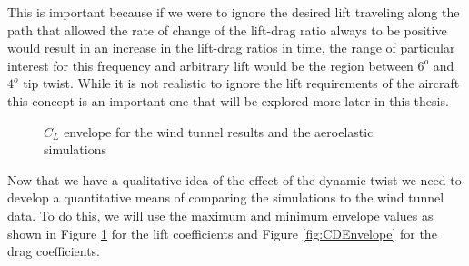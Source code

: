 \documentclass[11pt]{ucthesis}
\begin{document}
This is important because if we were to ignore the desired lift traveling along the path that allowed the rate of change of the lift-drag ratio always to be positive would result in an increase in the lift-drag ratios in time, the range of particular interest for this frequency and arbitrary lift would be the region between $6^o$ and $4^o$ tip twist. While it is not realistic to ignore the lift requirements of the aircraft this concept is an important one that will be explored more later in this thesis.

\begin{figure}[thpb]
\hfill
{}
\hfill
{}
\hfill
\caption{$C_L$ envelope for the wind tunnel results and the aeroelastic simulations}
\label{fig:CLEnvelope}
\end{figure}

Now that we have a qualitative idea of the effect of the dynamic twist we need to develop a quantitative means of comparing the simulations to the wind tunnel data. To do this, we will use the maximum and minimum envelope values as shown in Figure \ref{fig:CLEnvelope} for the lift coefficients and Figure \ref{fig:CDEnvelope} for the drag coefficients. 
\end{document}
